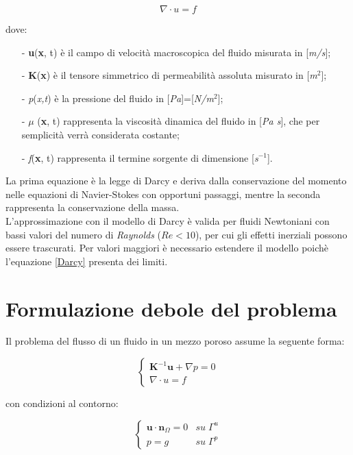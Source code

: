 \begin{equation}
\nabla \cdot u =f
\end{equation}

dove:
\begin{enumerate}
\item[-] \textbf{u}(\textbf{x}, t) è il campo di velocità macroscopica del fluido misurata in [\textit{m/s}];
\item[-] \textbf{K}(\textbf{x}) è il tensore simmetrico di permeabilità assoluta misurato in [\textit{m$^2$}];
\item[-] \textit{p}(\textit{x,t}) è la pressione del fluido in [\textit{Pa}]=[\textit{N/m$^2$}];
\item[-] \textit{$\mu$} (\textbf{x}, t) rappresenta la viscosità dinamica del fluido in [\textit{Pa s}], che per semplicità verrà considerata costante;
\item[-] \textit{f}(\textbf{x}, t) rappresenta il termine sorgente di dimensione [\textit{s}$^{-1}$].
\end{enumerate}


La prima equazione è la legge di Darcy e deriva dalla conservazione del momento nelle equazioni di Navier-Stokes con opportuni passaggi, mentre la seconda rappresenta la conservazione della massa. \\
L'approssimazione con il modello di Darcy è valida per fluidi Newtoniani con bassi valori del numero di \textit{Raynolds} ($Re<10$), per cui gli effetti inerziali possono essere trascurati. Per valori maggiori è necessario estendere il modello poichè l'equazione \ref{Darcy} presenta dei limiti.


 \section{Formulazione debole del problema}
Il problema del flusso di un fluido in un mezzo poroso assume la seguente forma:

\begin{equation}
\begin{cases}
\textbf{K}^{-1}  \textbf{u} +\nabla {p} =0 \\
\nabla  \cdot u =f
\end{cases} 
\end{equation}\label{sistema}

\noindent con condizioni al contorno:

\begin{equation}
\begin{cases}
\textbf{u} \cdot \textbf{n}_{\Omega} =0  & su \;  \Gamma ^u\\
p =g & su \; \Gamma ^p
\end{cases}
\end{equation}\label{bc}

